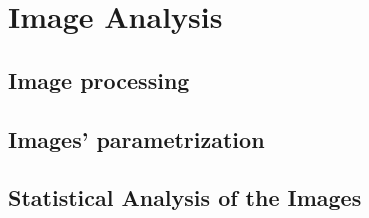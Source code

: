

\chapter{Image Analysis}
\label{chapter:imageana}

\section{Image processing}

\section{Images' parametrization}

\section{Statistical Analysis of the Images}

\endinput
%

